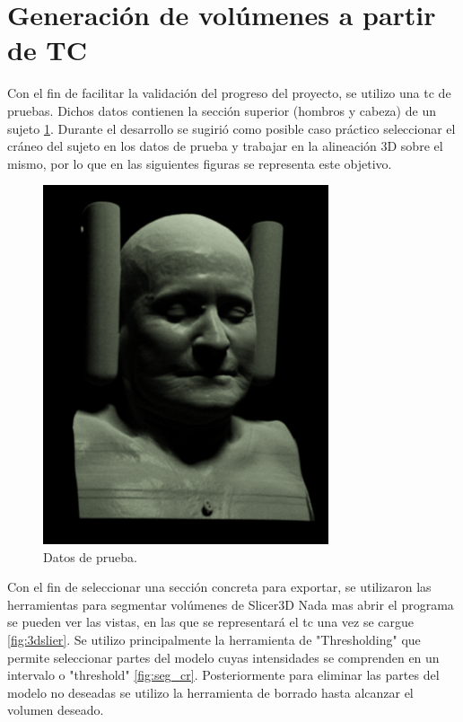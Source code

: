 \section{Generación de volúmenes a partir de TC}
Con el fin de facilitar la validación del progreso del proyecto, se utilizo una \acrshort{tc} de pruebas. Dichos datos contienen la sección superior (hombros y cabeza) de un sujeto \ref{fig:manix_full}. Durante el desarrollo se sugirió como posible caso práctico seleccionar el cráneo del sujeto en los datos de prueba y trabajar en la alineación 3D sobre el mismo, por lo que en las siguientes figuras se representa este objetivo.

\begin{figure}[hp!]
  \centering
  \includegraphics[width=0.75\textwidth]{imaxes/manix_full.png}
  \caption{Datos de prueba.}
  \label{fig:manix_full}
\end{figure}
Con el fin de seleccionar una sección concreta para exportar, se utilizaron las herramientas para segmentar volúmenes de Slicer3D
Nada mas abrir el programa se pueden ver las vistas, en las que se representará el \acrshort{tc} una vez se cargue \ref{fig:3dslier}.
Se utilizo principalmente la herramienta de "Thresholding" que permite seleccionar partes del modelo cuyas intensidades se comprenden en un intervalo o "threshold"  \ref{fig:seg_cr}. Posteriormente para eliminar las partes del modelo no deseadas se utilizo la herramienta de borrado hasta alcanzar el volumen deseado.

